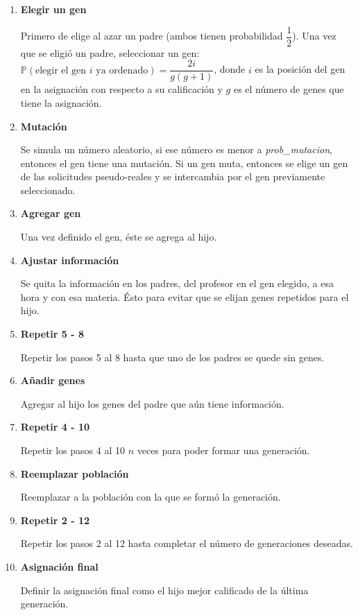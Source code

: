 \begin{enumerate}
\item \textbf{Elegir un gen}

Primero de elige al azar un padre (ambos tienen probabilidad $\dfrac{1}{2}$). Una vez que se eligió un padre, seleccionar un gen: $\mathbb{P}(\text{elegir el gen } i \text{ ya ordenado}) = \dfrac{2i}{g(g+1)}$, donde $i$ es la posición del gen en la asignación con respecto a su calificación y $g$ es el número de genes que tiene la asignación.

\item \textbf{Mutación}

Se simula un número aleatorio, si ese número es menor a \textit{prob\_mutacion}, entonces el gen tiene una mutación. Si un gen muta, entonces se elige un gen de las solicitudes pseudo-reales y se intercambia por el gen previamente seleccionado.

\item \textbf{Agregar gen}

Una vez definido el gen, éste se agrega al hijo.

\item \textbf{Ajustar información}

Se quita la información en los padres, del profesor en el gen elegido, a esa hora y con esa materia. Ésto para evitar que se elijan genes repetidos para el hijo.

\item \textbf{Repetir 5 - 8}

Repetir los pasos 5 al 8 hasta que uno de los padres se quede sin genes.

\item \textbf{Añadir genes}

Agregar al hijo los genes del padre que aún tiene información.

\item \textbf{Repetir 4 - 10}

Repetir los pasos 4 al 10 $n$ veces para poder formar una generación.

\item \textbf{Reemplazar población}

Reemplazar a la población con la que se formó la generación.

\item \textbf{Repetir 2 - 12}

Repetir los pasos 2 al 12 hasta completar el número de generaciones deseadas.

\item \textbf{Asignación final}

Definir la asignación final como el hijo mejor calificado de la última generación.
\end{enumerate}


